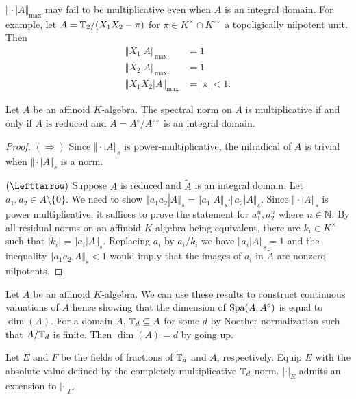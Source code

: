 \begin{example}
    $\Vert\cdot|A\Vert_{\max}$ may fail to be multiplicative even when $A$ is an integral domain. For example,
    let $A=\mathbb{T}_{2}/(X_{1}X_{2}-\pi)$ for $\pi\in K^{\times}\cap K^{\circ\circ}$ a topoligically nilpotent unit. Then 
    \begin{align*}
        \Vert X_{1}|A\Vert_{\max}&=1 \\
        \Vert X_{2}|A\Vert_{\max}&=1 \\
        \Vert X_{1}X_{2}|A\Vert_{\max} &= |\pi|<1.
    \end{align*}
\end{example}
\begin{proposition}\label{prop: multiplicative iff reduced}
    Let $A$ be an affinoid $K$-algebra. The spectral norm on $A$ is multiplicative if and only if $A$ is reduced and $\widetilde{A}=A^{\circ}/A^{\circ\circ}$ is an integral domain. 
\end{proposition}
\begin{proof}
    $(\Rightarrow)$ Since $\Vert\cdot|A\Vert_{s}$ is power-multiplicative, the nilradical of $A$ is trivial when $\Vert\cdot|A\Vert_{s}$ is a norm. 

    $(\Lefttarrow)$ Suppose $A$ is reduced and $\widetilde{A}$ is an integral domain. Let $a_{1},a_{2}\in A\setminus\{0\}$. We need to show $\Vert a_{1}a_{2}|A\Vert_{s}=\Vert a_{1}|A\Vert_{s}\cdot\Vert a_{2}|A\Vert_{s}$. Since $\Vert\cdot|A\Vert_{s}$ is power multiplicative, it suffices to prove the statement for $a_{1}^{n},a_{2}^{n}$ where $n\in\mathbb{N}$. By all residual norms on an affinoid $K$-algebra being equivalent, there are $k_{i}\in K^{\times}$ such that $|k_{i}|=\Vert a_{i}|A\Vert_{s}$. Replacing $a_{i}$ by $a_{i}/k_{i}$ we have $\Vert a_{i}|A\Vert_{s}=1$ and the inequality $\Vert a_{1}a_{2}|A\Vert_{s}<1$ would imply that the images of $a_{i}$ in $\widetilde{A}$ are nonzero nilpotents. 
\end{proof}
\begin{remark}
    Let $A$ be an affinoid $K$-algebra. We can use these results to construct continuous valuations of $A$ hence showing that the dimension of $\mathrm{Spa}(A,A^{\circ})$ is equal to $\dim(A)$. For a domain $A$, $\mathbb{T}_{d}\subseteq A$ for some $d$ by Noether normalization such that $A/\mathbb{T}_{d}$ is finite. Then $\dim(A)=d$ by going up. 
\end{remark} %
Let $E$ and $F$ be the fields of fractions of $\mathbb{T}_{d}$ and $A$, respectively. Equip $E$ with the absolute value defined by the completely multiplicative $\mathbb{T}_{d}$-norm. $|\cdot|_{E}$ admits an extension to $|\cdot|_{F}$. 
